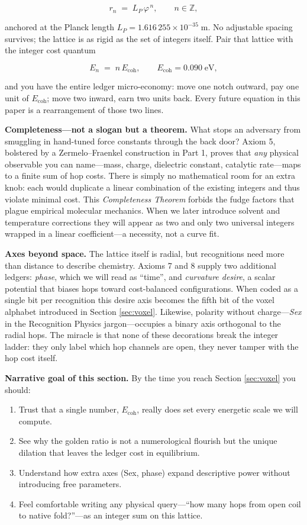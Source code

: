 \documentclass[11pt]{article}
\newcommand{\phiGR}{\varphi}                 %
\newcommand{\LP}{L_{\!P}}                    %
\newcommand{\Eoh}{E_{\mathrm{coh}}}          %
\begin{document}
\[
  r_{n} \;=\; \LP\,\phiGR^{\,n}, 
  \qquad n\in\mathbb Z,
\]

\noindent
anchored at the Planck length \(\LP = 1.616\,255\times10^{-35}\;\text{m}\).
No adjustable spacing survives; the lattice is as rigid as the set of
integers itself.  Pair that lattice with the integer cost quantum  

\[
  E_{n} \;=\; n\,\Eoh, 
  \qquad \Eoh = 0.090\;\text{eV},
\]

\noindent
and you have the entire ledger micro-economy: move one notch outward,
pay one unit of \(\Eoh\); move two inward, earn two units back.  Every
future equation in this paper is a rearrangement of those two lines.

\bigskip
\noindent
\textbf{Completeness—not a slogan but a theorem.}  
What stops an adversary from smuggling in hand-tuned force constants
through the back door?  Axiom 5, bolstered by a Zermelo–Fraenkel
construction in Part 1, proves that \emph{any} physical observable you
can name—mass, charge, dielectric constant, catalytic rate—maps to a
finite sum of hop costs.  There is simply no mathematical room for an
extra knob: each would duplicate a linear combination of the existing
integers and thus violate minimal cost.  This \emph{Completeness
Theorem} forbids the fudge factors that plague empirical molecular
mechanics.  When we later introduce solvent and temperature corrections
they will appear as two and only two universal integers wrapped in a
linear coefficient—a necessity, not a curve fit.

\bigskip
\noindent
\textbf{Axes beyond space.}  
The lattice itself is radial, but recognitions need more than distance
to describe chemistry.  Axioms 7 and 8 supply two additional ledgers:
\emph{phase}, which we will read as “time”, and \emph{curvature desire},
a scalar potential that biases hops toward cost-balanced configurations.
When coded as a single bit per recognition this desire axis becomes the
fifth bit of the voxel alphabet introduced in Section \ref{sec:voxel}.
Likewise, polarity without charge—\emph{Sex} in the Recognition Physics
jargon—occupies a binary axis orthogonal to the radial hops.  The miracle
is that none of these decorations break the integer ladder: they only
label which hop channels are open, they never tamper with the hop cost
itself.

\bigskip
\noindent
\textbf{Narrative goal of this section.}  
By the time you reach Section \ref{sec:voxel} you should:

\begin{enumerate}
  \item Trust that a single number, \(\Eoh\), really does set every
    energetic scale we will compute.
  \item See why the golden ratio is not a numerological flourish but the
    unique dilation that leaves the ledger cost in equilibrium.
  \item Understand how extra axes (Sex, phase) expand descriptive power
    without introducing free parameters.
  \item Feel comfortable writing any physical query—“how many hops from
    open coil to native fold?”—as an integer sum on this lattice.
\end{enumerate}
\end{document}
